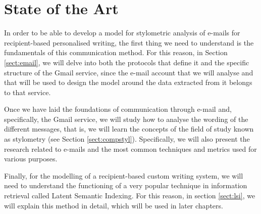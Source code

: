 \chapter{State of the Art}
\label{cap:estadoDeLaCuestion}

In order to be able to develop a model for stylometric analysis of e-mails for recipient-based personalised writing, the first thing we need to understand is the fundamentals of this communication method. For this reason, in Section \ref{sect:email}, we will delve into both the protocols that define it and the specific structure of the Gmail service, since the e-mail account that we will analyse and that will be used to design the model around the data extracted from it belongs to that service.

Once we have laid the foundations of communication through e-mail and, specifically, the Gmail service, we will study how to analyse the wording of the different messages, that is, we will learn the concepts of the field of study known as stylometry (see Section \ref{sect:compstyl}). Specifically, we will also present the research related to e-mails and the most common techniques and metrics used for various purposes.

Finally, for the modelling of a recipient-based custom writing system, we will need to understand the functioning of a very popular technique in information retrieval called Latent Semantic Indexing. For this reason, in section \ref{sect:lsi}, we will explain this method in detail, which will be used in later chapters.





